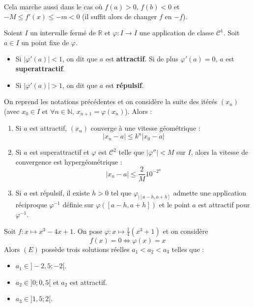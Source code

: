   \begin{remark}
    Cela marche aussi dans le cas où $f(a) > 0$, $f(b) < 0$ et $-M \leq f'(x) \leq -m < 0$ (il suffit alors de changer $f$ en $-f$).
  \end{remark}

  \begin{definition}
    Soient $I$ un intervalle fermé de $\mathbb{R}$ et $\varphi : I \rightarrow I$ une application de classe $\mathcal{C}^1$. Soit $a \in I$ un point fixe de $\varphi$.
    \begin{itemize}
      \item Si $|\varphi'(a)| < 1$, on dit que $a$ est \textbf{attractif}. Si de plus $\varphi'(a) = 0$, $a$ est \textbf{superattractif}.
      \item Si $|\varphi'(a)| > 1$, on dit que $a$ est \textbf{répulsif}.
    \end{itemize}
  \end{definition}

  \begin{proposition}
    On reprend les notations précédentes et on considère la suite des itérés $(x_n)$ (avec $x_0 \in I$ et $\forall n \in \mathbb{N}, \, x_{n+1} = \varphi(x_n)$). Alors :
    \begin{enumerate}[label={\bfseries(\roman*)}]
      \item Si $a$ est attractif, $(x_n)$ converge à une vitesse géométrique :
      \[ |x_n - a| \leq k^n |x_0 - a| \]
      \item Si $a$ est superattractif et $\varphi$ est $\mathcal{C}^2$ telle que $|\varphi''| < M$ sur $I$, alors la vitesse de convergence est hypergéométrique :
      \[ |x_n - a| \leq \frac{2}{M} 10^{-2^n} \]
      \item Si $a$ est répulsif, il existe $h > 0$ tel que $\varphi_{|[a-h, a+h]}$ admette une application réciproque $\varphi^{-1}$ définie sur $\varphi([a-h, a+h])$ et le point $a$ est attractif pour $\varphi^{-1}$.
    \end{enumerate}
  \end{proposition}

  \begin{example}
    Soit $f : x \mapsto x^3 - 4x + 1$. On pose $\varphi : x \mapsto \frac{1}{4} (x^3 + 1)$ et on considère
    \[ f(x) = 0 \iff \varphi(x) = x \tag{$E$} \]
    Alors $(E)$ possède trois solutions réelles $a_1 < a_2 < a_3$ telles que :
    \begin{itemize}
      \item $a_1 \in ]-2,5; -2[$.
      \item $a_2 \in ]0; 0,5[$ et $a_2$ est attractif.
      \item $a_3 \in ]1,5; 2[$.
    \end{itemize}
  \end{example}

